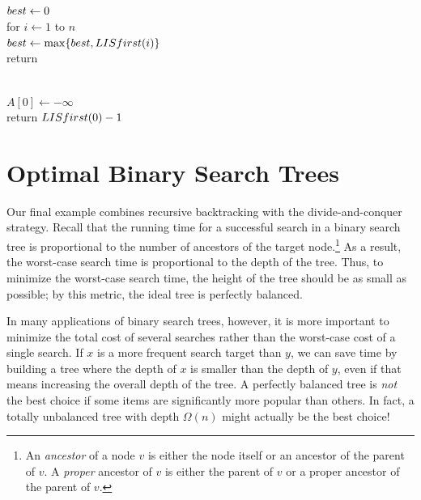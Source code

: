 \begin{center}
\begin{minipage}[c]{0.55\linewidth}
\begin{pseudocode}
\\
$best \gets 0$\\
for $i \gets 1$ to $n$\\
\Indent $best \gets \max\{best, LISfirst(i)\}$\\
return 
\end{pseudocode}
\end{minipage}\hfill
\begin{minipage}[c]{0.42\linewidth}
\begin{pseudocode}
\\
$A[0] \gets -\infty$\\
return $LISfirst(0) - 1$
\end{pseudocode}
\end{minipage}
\end{center}

\section{Optimal Binary Search Trees}
\label{sec:2.8}

Our final example combines recursive backtracking with the divide-and-conquer strategy.
Recall that the running time for a successful search in a binary search tree is proportional to the number of ancestors of the target node.\footnote{An \textit{ancestor} of a node $v$ is either the node itself or an ancestor of the parent of $v$. A \textit{proper} ancestor of $v$ is either the parent of $v$ or a proper ancestor of the parent of $v$.}
As a result, the worst-case search time is proportional to the depth of the tree.
Thus, to minimize the worst-case search time, the height of the tree should be as small as possible; by this metric, the ideal tree is perfectly balanced.

In many applications of binary search trees, however, it is more important to minimize the total cost of several searches rather than the worst-case cost of a single search.
If $x$ is a more frequent search target than $y$, we can save time by building a tree where the depth of $x$ is smaller than the depth of $y$, even if that means increasing the overall depth of the tree.
A perfectly balanced tree is \textit{not} the best choice if some items are significantly more popular than others.
In fact, a totally unbalanced tree with depth $\Omega(n)$ might actually be the best choice!

